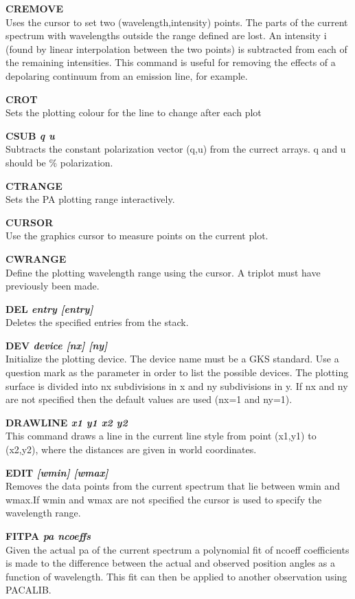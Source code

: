 \documentclass[11pt,nolof,noabs]{starlink}
\begin{document}
\textbf{CREMOVE} \\
Uses the cursor to set two (wavelength,intensity) points. The parts of
the current spectrum with wavelengths outside the range defined are
lost. An intensity i (found by linear interpolation between the two
points) is subtracted from each of the remaining intensities. This
command is useful for removing the effects of a depolaring continuum
from an emission line, for example.


\textbf{CROT} \\
Sets the plotting colour for the line to change after each plot

\textbf{CSUB \it q u} \\
Subtracts the constant polarization vector (q,u) from the currect
arrays. q and u should be \% polarization.

\textbf{CTRANGE} \\
Sets the PA plotting range interactively.

\textbf{CURSOR} \\
Use the graphics cursor to measure points on the current plot.

\textbf{CWRANGE } \\
Define the plotting wavelength range using the cursor. A triplot must
have previously been made.

\textbf{DEL \it  entry [entry] } \\
Deletes the specified entries from the stack.

\textbf{DEV \it  device [nx] [ny]} \\
Initialize the plotting device. The device name must be a GKS standard. Use a
question mark as the parameter in order to list the possible devices. The
plotting surface is divided into nx subdivisions in x and ny subdivisions in
y. If nx and ny are not specified then the default values are used (nx=1 and
ny=1).

\textbf{DRAWLINE \it x1 y1 x2 y2} \\
This command draws a line in the current line style from point (x1,y1)
to (x2,y2), where the distances are given in world coordinates.

\textbf{EDIT \it [wmin] [wmax]} \\
Removes the data points from the current spectrum that lie between
wmin and wmax.If wmin and wmax are not specified the cursor is used to
specify the wavelength range.

\textbf{FITPA \it pa ncoeffs} \\
Given the actual pa of the current spectrum a polynomial fit of ncoeff
coefficients is made to the difference between the actual and observed
position angles as a function of wavelength. This fit can then be
applied to another observation using PACALIB.
\end{document}
